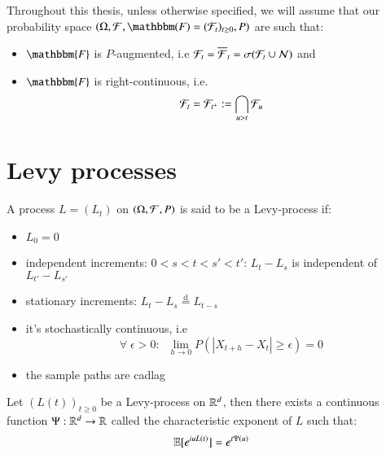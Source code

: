 \newpage 
\begin{assumption}
Throughout this thesis, unless otherwise specified, we will assume that our probability space $(\Omega, \F, \mathbbm(F) = (\F_{t})_{t\geq 0}, P)$ are such that:
\begin{itemize}
    \item $\mathbbm{F}$ is $P$-augmented, i.e $\mathcal{F}_{t} = \overline{\mathcal{F}}_{t} = \sigma(\mathcal{F}_{t}\cup \mathcal{N})$ and
    \item $\mathbbm{F}$ is right-continuous, i.e. 
    \[
    \mathcal{F}_{t} = \mathcal{F}_{t^{+}}:= \bigcap_{u>t}\mathcal{F}_{u}
    \]
\end{itemize}
\end{assumption}
\newpage 






















\newpage

\newpage
\section{Levy processes}

\begin{definition}
A process $L = (L_{t})$ on $(\Omega, \mathcal{F}, P)$ is said to be a Levy-process if: 
\begin{itemize}[leftmargin=*]
    \item $L_{0} = 0$
    \item independent increments: $0 < s < t < s'< t'$: 
    $L_{t}-L_{s}$ is independent of $L_{t'}-L_{s'}$
    \item stationary increments: 
    $L_{t} -L_{s} \stackrel{\text{d}}{=} L_{t-s}$
    \item it's stochastically continuous, i.e 
    $$
    \forall \; \epsilon > 0: \;\; \lim\limits_{h \to 0}P(|X_{t+h}-X_{t}| \geq \epsilon) = 0
    $$
    \item the sample paths are cadlag
\end{itemize} 
\end{definition}


\begin{proposition}
Let $(L(t))_{t\geq 0}$ be a Levy-process on $\mathbb{R}^{d}$, then there exists a continuous function $\Psi: \mathbb{R}^{d} \to \mathbb{R}$ called the characteristic exponent of $L$ such that: 
$$
\mathbb{E}[e^{iuL(t)}] = e^{t\Psi(u)}
$$
\end{proposition}

